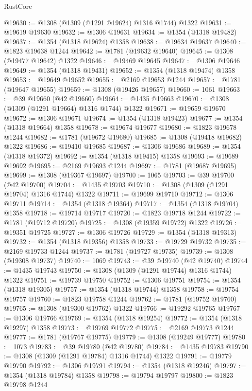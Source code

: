 \begin{lexlean}{RustCore}
\begin{coremodule}
@19630 := @1308 (@1309 (@1291 @19624) @1316 @1744) @1322
@19631 := @19619 @19630
@19632 := @1306 @19631
@19634 := @1354 (@1318 @19482)
@19637 := @1354 (@1318 @19624) @1358
@19638 := @19634 @19637
@19640 := @1823 @19638 @1244
@19642 := @1781 (@19632 @19640)
@19645 := @1308 (@19477 @19642) @1322
@19646 := @19469 @19645
@19647 := @1306 @19646
@19649 := @1354 (@1318 @19431)
@19652 := @1354 (@1318 @19474) @1358
@19653 := @19649 @19652
@19655 := @2169 @19653 @1244
@19657 := @1781 (@19647 @19655)
@19659 := @1308 (@19426 @19657)
@19660 := 1061
@19663 := @39 @19660 (@42 @19660)
@19664 := @1435 @19663
@19670 := @1308 (@1309 (@1291 @19664) @1316 @1744) @1322
@19671 := @19659 @19670
@19672 := @1306 @19671
@19674 := @1354 (@1318 @19423)
@19677 := @1354 (@1318 @19664) @1358
@19678 := @19674 @19677
@19680 := @1823 @19678 @1244
@19682 := @1781 (@19672 @19680)
@19685 := @1308 (@19418 @19682) @1322
@19686 := @19410 @19685
@19687 := @1306 @19686
@19689 := @1354 (@1318 @19372)
@19692 := @1354 (@1318 @19415) @1358
@19693 := @19689 @19692
@19695 := @2169 @19693 @1244
@19697 := @1781 (@19687 @19695)
@19699 := @1308 (@19367 @19697)
@19700 := 1065
@19703 := @39 @19700 (@42 @19700)
@19704 := @1435 @19703
@19710 := @1308 (@1309 (@1291 @19704) @1316 @1744) @1322
@19711 := @19699 @19710
@19712 := @1306 @19711
@19714 := @1354 (@1318 @19364)
@19717 := @1354 (@1318 @19704) @1358
@19718 := @19714 @19717
@19720 := @1823 @19718 @1244
@19722 := @1781 (@19712 @19720)
@19725 := @1308 (@19359 @19722) @1322
@19726 := @19351 @19725
@19727 := @1306 @19726
@19729 := @1354 (@1318 @19313)
@19732 := @1354 (@1318 @19356) @1358
@19733 := @19729 @19732
@19735 := @2169 @19733 @1244
@19737 := @1781 (@19727 @19735)
@19739 := @1308 (@19308 @19737)
@19740 := 1069
@19743 := @39 @19740 (@42 @19740)
@19744 := @1435 @19743
@19750 := @1308 (@1309 (@1291 @19744) @1316 @1744) @1322
@19751 := @19739 @19750
@19752 := @1306 @19751
@19754 := @1354 (@1318 @19305)
@19757 := @1354 (@1318 @19744) @1358
@19758 := @19754 @19757
@19760 := @1823 @19758 @1244
@19762 := @1781 (@19752 @19760)
@19765 := @1308 (@19300 @19762) @1322
@19766 := @19292 @19765
@19767 := @1306 @19766
@19769 := @1354 (@1318 @19254)
@19772 := @1354 (@1318 @19297) @1358
@19773 := @19769 @19772
@19775 := @2169 @19773 @1244
@19777 := @1781 (@19767 @19775)
@19779 := @1308 (@19249 @19777)
@19780 := 1073
@19783 := @39 @19780 (@42 @19780)
@19784 := @1435 @19783
@19790 := @1308 (@1309 (@1291 @19784) @1316 @1744) @1322
@19791 := @19779 @19790
@19792 := @1306 @19791
@19794 := @1354 (@1318 @19246)
@19797 := @1354 (@1318 @19784) @1358
@19798 := @19794 @19797
@19800 := @1823 @19798 @1244

\end{coremodule}
\end{lexlean}
